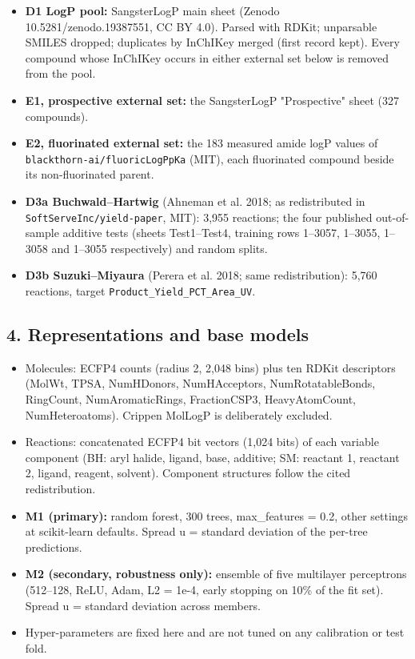 \begin{itemize}
\tightlist
\item
  \textbf{D1 LogP pool:} SangsterLogP main sheet (Zenodo
  10.5281/zenodo.19387551, CC BY 4.0). Parsed with RDKit; unparsable
  SMILES dropped; duplicates by InChIKey merged (first record kept).
  Every compound whose InChIKey occurs in either external set below is
  removed from the pool.
\item
  \textbf{E1, prospective external set:} the SangsterLogP "Prospective"
  sheet (327 compounds).
\item
  \textbf{E2, fluorinated external set:} the 183 measured amide logP
  values of \texttt{blackthorn-ai/fluoricLogPpKa} (MIT), each
  fluorinated compound beside its non-fluorinated parent.
\item
  \textbf{D3a Buchwald--Hartwig} (Ahneman et al. 2018; as redistributed
  in \texttt{SoftServeInc/yield-paper}, MIT): 3,955 reactions; the four
  published out-of-sample additive tests (sheets Test1--Test4, training
  rows 1--3057, 1--3055, 1--3058 and 1--3055 respectively) and random
  splits.
\item
  \textbf{D3b Suzuki--Miyaura} (Perera et al. 2018; same
  redistribution): 5,760 reactions, target
  \texttt{Product\_Yield\_PCT\_Area\_UV}.
\end{itemize}

\hypertarget{4-representations-and-base-models}{%
\subsection{4. Representations and base
models}\label{4-representations-and-base-models}}

\begin{itemize}
\tightlist
\item
  Molecules: ECFP4 counts (radius 2, 2,048 bins) plus ten RDKit
  descriptors (MolWt, TPSA, NumHDonors, NumHAcceptors,
  NumRotatableBonds, RingCount, NumAromaticRings, FractionCSP3,
  HeavyAtomCount, NumHeteroatoms). Crippen MolLogP is deliberately
  excluded.
\item
  Reactions: concatenated ECFP4 bit vectors (1,024 bits) of each
  variable component (BH: aryl halide, ligand, base, additive; SM:
  reactant 1, reactant 2, ligand, reagent, solvent). Component
  structures follow the cited redistribution.
\item
  \textbf{M1 (primary):} random forest, 300 trees, max\_features = 0.2,
  other settings at scikit-learn defaults. Spread u = standard deviation
  of the per-tree predictions.
\item
  \textbf{M2 (secondary, robustness only):} ensemble of five multilayer
  perceptrons (512--128, ReLU, Adam, L2 = 1e-4, early stopping on 10\%
  of the fit set). Spread u = standard deviation across members.
\item
  Hyper-parameters are fixed here and are not tuned on any calibration
  or test fold.
\end{itemize}


